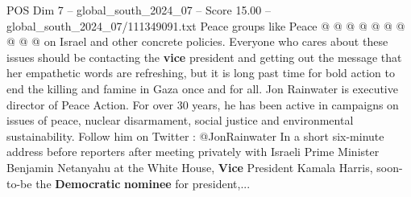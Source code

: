 \begin{textsample}{POS Dim 7 – global\_south\_2024\_07 – Score 15.00 – global\_south\_2024\_07/111349091.txt}
Peace groups like Peace @ @ @ @ @ @ @ @ @ @ on Israel and other concrete policies.
Everyone who cares about these issues should be contacting the \textbf{vice} president and getting out the message that her empathetic words are refreshing, but it is long past time for bold action to end the killing and famine in Gaza once and for all.
Jon Rainwater is executive director of Peace Action.
For over 30 years, he has been active in campaigns on issues of peace, nuclear disarmament, social justice and environmental sustainability.
Follow him on Twitter : @JonRainwater In a short six-minute address before reporters after meeting privately with Israeli Prime Minister Benjamin Netanyahu at the White House, \textbf{Vice} President Kamala Harris, soon-to-be the \textbf{Democratic} \textbf{nominee} for president,...

\end{textsample}
